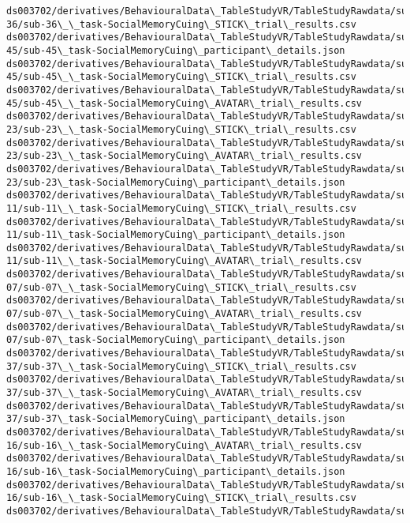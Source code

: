 \documentclass[11pt]{article}
\begin{document}
\begin{Verbatim}[commandchars=\\\{\}]
ds003702/derivatives/BehaviouralData\_TableStudyVR/TableStudyRawdata/sub-
36/sub-36\_\_task-SocialMemoryCuing\_STICK\_trial\_results.csv
ds003702/derivatives/BehaviouralData\_TableStudyVR/TableStudyRawdata/sub-
45/sub-45\_task-SocialMemoryCuing\_participant\_details.json
ds003702/derivatives/BehaviouralData\_TableStudyVR/TableStudyRawdata/sub-
45/sub-45\_\_task-SocialMemoryCuing\_STICK\_trial\_results.csv
ds003702/derivatives/BehaviouralData\_TableStudyVR/TableStudyRawdata/sub-
45/sub-45\_\_task-SocialMemoryCuing\_AVATAR\_trial\_results.csv
ds003702/derivatives/BehaviouralData\_TableStudyVR/TableStudyRawdata/sub-
23/sub-23\_\_task-SocialMemoryCuing\_STICK\_trial\_results.csv
ds003702/derivatives/BehaviouralData\_TableStudyVR/TableStudyRawdata/sub-
23/sub-23\_\_task-SocialMemoryCuing\_AVATAR\_trial\_results.csv
ds003702/derivatives/BehaviouralData\_TableStudyVR/TableStudyRawdata/sub-
23/sub-23\_task-SocialMemoryCuing\_participant\_details.json
ds003702/derivatives/BehaviouralData\_TableStudyVR/TableStudyRawdata/sub-
11/sub-11\_\_task-SocialMemoryCuing\_STICK\_trial\_results.csv
ds003702/derivatives/BehaviouralData\_TableStudyVR/TableStudyRawdata/sub-
11/sub-11\_task-SocialMemoryCuing\_participant\_details.json
ds003702/derivatives/BehaviouralData\_TableStudyVR/TableStudyRawdata/sub-
11/sub-11\_\_task-SocialMemoryCuing\_AVATAR\_trial\_results.csv
ds003702/derivatives/BehaviouralData\_TableStudyVR/TableStudyRawdata/sub-
07/sub-07\_\_task-SocialMemoryCuing\_STICK\_trial\_results.csv
ds003702/derivatives/BehaviouralData\_TableStudyVR/TableStudyRawdata/sub-
07/sub-07\_\_task-SocialMemoryCuing\_AVATAR\_trial\_results.csv
ds003702/derivatives/BehaviouralData\_TableStudyVR/TableStudyRawdata/sub-
07/sub-07\_task-SocialMemoryCuing\_participant\_details.json
ds003702/derivatives/BehaviouralData\_TableStudyVR/TableStudyRawdata/sub-
37/sub-37\_\_task-SocialMemoryCuing\_STICK\_trial\_results.csv
ds003702/derivatives/BehaviouralData\_TableStudyVR/TableStudyRawdata/sub-
37/sub-37\_\_task-SocialMemoryCuing\_AVATAR\_trial\_results.csv
ds003702/derivatives/BehaviouralData\_TableStudyVR/TableStudyRawdata/sub-
37/sub-37\_task-SocialMemoryCuing\_participant\_details.json
ds003702/derivatives/BehaviouralData\_TableStudyVR/TableStudyRawdata/sub-
16/sub-16\_\_task-SocialMemoryCuing\_AVATAR\_trial\_results.csv
ds003702/derivatives/BehaviouralData\_TableStudyVR/TableStudyRawdata/sub-
16/sub-16\_task-SocialMemoryCuing\_participant\_details.json
ds003702/derivatives/BehaviouralData\_TableStudyVR/TableStudyRawdata/sub-
16/sub-16\_\_task-SocialMemoryCuing\_STICK\_trial\_results.csv
ds003702/derivatives/BehaviouralData\_TableStudyVR/TableStudyRawdata/sub-

\end{Verbatim}
\end{document}
